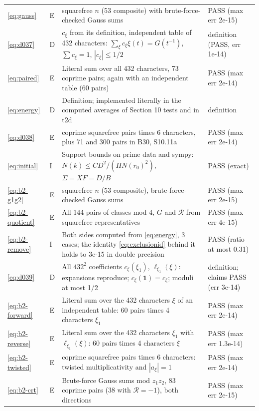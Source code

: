 \documentclass[11pt]{article}
\numberwithin{equation}{section}
\begin{document}
\begin{longtable}{@{}>{\raggedright\arraybackslash}p{1.2cm}>{\centering\arraybackslash}p{0.7cm}>{\raggedright\arraybackslash}p{9.05cm}>{\raggedright\arraybackslash}p{4.3cm}@{}}
\eqref{eq:gauss} & E & 150 squarefree $n$ (53 composite) with brute-force-checked Gauss sums & PASS (max err 2e-15)\\
\eqref{eq:d037} & D & $c_\xi$ from its definition, independent table of 432 characters: $\sum_\xi c_\xi\xi(t)=G(t^{-1})$, $\sum c_\xi=1$, $|c_\xi|\le1/2$ & definition (PASS, err 1e-14)\\
\eqref{eq:paired} & E & Literal sum over all 432 characters, 73 coprime pairs; again with an independent table (60 pairs) & PASS (max err 2e-14)\\
\eqref{eq:energy} & D & Definition; implemented literally in the computed averages of Section 10 tests and in t2d & definition\\
\eqref{eq:d038} & E & 120 coprime squarefree pairs times 6 characters, plus 71 and 300 pairs in B30, S10.11a & PASS (max err 2e-14)\\
\eqref{eq:initial} & I & Support bounds on prime data and sympy: $N(k)\le CD^2/(HN(r_0)^2)$, $\Sigma=XF=D/B$ & PASS (exact)\\
\eqref{eq:b2-g1g2} & E & 150 squarefree $n$ (53 composite), brute-force-checked Gauss sums & PASS (max err 2e-15)\\
\eqref{eq:b2-quotient} & E & All 144 pairs of classes mod 4, $G$ and $\mathcal R$ from squarefree representatives & PASS (max err 4e-15)\\
\eqref{eq:b2-remove} & I & Both sides computed from \eqref{eq:energy}, 3 cases; the identity \eqref{eq:exclusionid} behind it holds to 3e-15 in double precision & PASS (ratio at most 0.31)\\
\eqref{eq:d039} & D & All $432^2$ coefficients $c_\xi(\xi_1)$, $\ell_{\xi_1}(\xi)$: expansions reproduce; $c_\xi(\mathbf1)=c_\xi$; moduli at most 1/2 & definition; claims PASS (err 3e-14)\\
\eqref{eq:b2-forward} & E & Literal sum over the 432 characters $\xi$ of an independent table: 60 pairs times 4 characters $\xi_1$ & PASS (max err 2e-14)\\
\eqref{eq:b2-reverse} & E & Literal sum over the 432 characters $\xi_1$ with $\ell_{\xi_1}(\xi)$: 60 pairs times 4 characters $\xi$ & PASS (max err 1.3e-14)\\
\eqref{eq:b2-twisted} & E & 120 coprime squarefree pairs times 6 characters: twisted multiplicativity and $|a_\xi|=1$ & PASS (max err 2e-14)\\
\eqref{eq:b2-crt} & E & Brute-force Gauss sums mod $z_1z_2$, 83 coprime pairs (38 with $\mathcal R=-1$), both directions & PASS (max err 2e-15)\\

\end{longtable}
\end{document}
